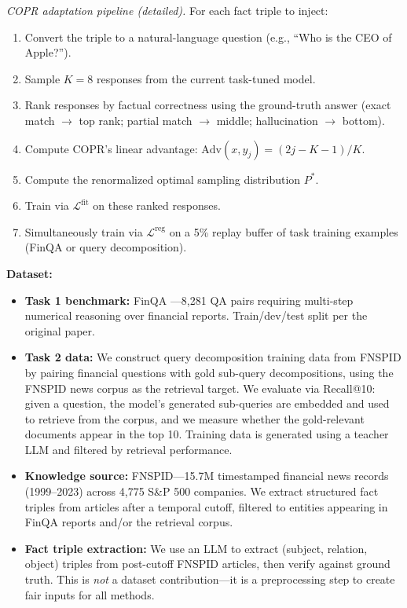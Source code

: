 \documentclass{article}
\begin{document}
\textit{COPR adaptation pipeline (detailed).}
For each fact triple to inject:
\begin{enumerate}
    \item Convert the triple to a natural-language question (e.g., ``Who is the CEO of Apple?'').
    \item Sample $K = 8$ responses from the current task-tuned model.
    \item Rank responses by factual correctness using the ground-truth answer (exact match $\to$ top rank; partial match $\to$ middle; hallucination $\to$ bottom).
    \item Compute COPR's linear advantage: $\mathrm{Adv}(x, y_j) = (2j - K - 1)/K$.
    \item Compute the renormalized optimal sampling distribution $P^*$.
    \item Train via $\mathcal{L}^{\text{fit}}$ on these ranked responses.
    \item Simultaneously train via $\mathcal{L}^{\text{reg}}$ on a 5\% replay buffer of task training examples (FinQA or query decomposition).
\end{enumerate}

\bigskip

\textbf{Dataset:}
\begin{itemize}
    \item \textbf{Task 1 benchmark:} FinQA \citep{chen2021finqa}---8,281 QA pairs requiring multi-step numerical reasoning over financial reports. Train/dev/test split per the original paper.
    \item \textbf{Task 2 data:} We construct query decomposition training data from FNSPID \citep{dong2024fnspid} by pairing financial questions with gold sub-query decompositions, using the FNSPID news corpus as the retrieval target. We evaluate via Recall@10: given a question, the model's generated sub-queries are embedded and used to retrieve from the corpus, and we measure whether the gold-relevant documents appear in the top 10. Training data is generated using a teacher LLM and filtered by retrieval performance.
    \item \textbf{Knowledge source:} FNSPID---15.7M timestamped financial news records (1999--2023) across 4,775 S\&P 500 companies. We extract structured fact triples from articles after a temporal cutoff, filtered to entities appearing in FinQA reports and/or the retrieval corpus.
    \item \textbf{Fact triple extraction:} We use an LLM to extract (subject, relation, object) triples from post-cutoff FNSPID articles, then verify against ground truth. This is \emph{not} a dataset contribution---it is a preprocessing step to create fair inputs for all methods.
\end{itemize}
\end{document}
